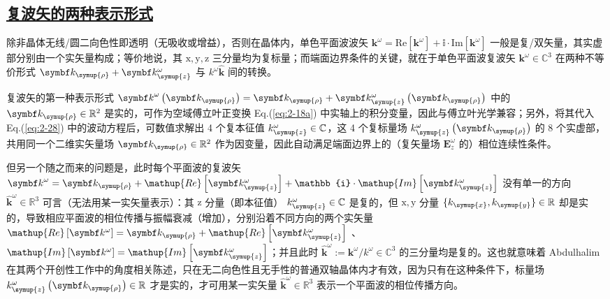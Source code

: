 \subsection{\protect\hyperlink{chap:\thesubsection}{复波矢的两种表示形式}}
\label{复波矢的两种表示形式}

除非晶体无线/圆二向色性即透明（无吸收或增益），否则在晶体内，单色平面波波矢 ${\symbf k}^\omega = \mathup{Re} \left[ \symbf k^\omega \right] + \mathbb{i} \cdot \mathup{Im} \left[ \symbf k^\omega \right]$ 一般是复/双矢量，其实虚部分别由一个实矢量构成；等价地说，其 $\mathup x,\mathup y,\mathup z$ 三分量均为复标量；而端面边界条件的关键，就在于单色平面波复波矢 ${\symbf k}^\omega \in \mathbb{C}^3$ 在两种不等价形式 $\symbf k_{\symup{\rho}} + \symbf k^\omega_{\symup{z}}$ 与 $k^\omega \hat{\symbf k}$ 间的转换。

复波矢的第一种表示形式 ${\symbf k}^\omega \left( \symbf k_{\symup{\rho}} \right) = \symbf k_{\symup{\rho}} + \symbf k^\omega_{\symup{z}} \left( \symbf k_{\symup{\rho}} \right)$ 中的 $\symbf k_{\symup{\rho}} \in \mathbb{R}^2$
是实的，可作为空域傅立叶正变换 Eq.(\ref{eq:2-18a}) 中实轴上的积分变量，因此与傅立叶光学兼容；另外，将其代入 Eq.(\ref{eq:2-28}) 中的波动方程后，可数值求解出 4 个复本征值 $k^\omega_{\symup{z}} \in \mathbb{C}$，这 4 个复标量场 $k^\omega_{\symup{z}} \left( \symbf k_{\symup{\rho}} \right)$ 的 8 个实虚部，共用同一个二维实矢量场 $\symbf k_{\symup{\rho}} \in \mathbb{R}^2$ 作为因变量，因此自动满足端面边界上的（复矢量场 $\symbf E^{\omega}_z$ 的）相位连续性条件。

但另一个随之而来的问题是，此时每个平面波的复波矢 ${\symbf k}^\omega = \symbf k_{\symup{\rho}} + \mathup{Re} \left[ \symbf k^\omega_{\symup{z}} \right] + \mathbb{i} \cdot \mathup{Im} \left[ \symbf k^\omega_{\symup{z}} \right]$ 没有单一的方向 $\hat{\symbf k}^\omega \in \mathbb{R}^3$ 可言（无法用某一实矢量表示）：其 $\mathup z$ 分量（即本征值） $k^\omega_{\symup{z}} \in \mathbb{C}$ 是复的，但 $\mathup x,\mathup y$ 分量 $\{k_{\symup{x}}, k_{\symup{y}}\} \in \mathbb{R}$ 却是实的，导致相应平面波的相位传播与振幅衰减（增加），分别沿着不同方向的两个实矢量 $\mathup{Re} \left[ \symbf k^\omega \right] = \symbf k_{\symup{\rho}} + \mathup{Re} \left[ \symbf k^\omega_{\symup{z}} \right]$ 、 $\mathup{Im} \left[ \symbf k^\omega \right] = \mathup{Im} \left[ \symbf k^\omega_{\symup{z}} \right]$；并且此时 $\hat{\symbf k}^\omega := {\symbf k}^\omega \big/ k^\omega \in \mathbb{C}^3$ 的三分量均是复的。这也就意味着 Abdulhalim 在其两个开创性工作\cite{abdulhalimAnalyticFormulaeRefractive1998,abdulhalimExactMatrixMethod1999}中的角度相关陈述，只在无二向色性且无手性的普通双轴晶体内才有效，因为只有在这种条件下，标量场 $k^\omega_{\symup{z}} \left( \symbf k_{\symup{\rho}} \right) \in \mathbb{R}$ 才是实的，才可用某一实矢量 $\hat{\symbf k}^\omega \in \mathbb{R}^3$ 表示一个平面波的相位传播方向。

